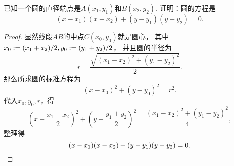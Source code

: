 \begin{example}
已知一个圆的直径端点是\(A(x_1,y_1)\)和\(B(x_2,y_2)\).
证明：圆的方程是\begin{equation}\label{equation:平面解析几何.圆的直径式方程}
	(x-x_1)(x-x_2) + (y-y_1)(y-y_2) = 0.
\end{equation}
\begin{proof}
显然线段\(AB\)的中点\(C(x_0,y_0)\)就是圆心，
其中\(
	x_0 := (x_1+x_2)/2,
	y_0 := (y_1+y_2)/2
\)，
并且圆的半径为\begin{equation*}
	r = \frac{\sqrt{(x_1-x_2)^2+(y_1-y_2)^2}}{2}.
\end{equation*}
那么所求圆的标准方程为\begin{equation*}
	(x-x_0)^2 + (y-y_0)^2 = r^2.
\end{equation*}
代入\(x_0,y_0,r\)，得\begin{equation*}
	\left( x - \frac{x_1+x_2}{2} \right)^2
	+ \left( y - \frac{y_1+y_2}{2} \right)^2
	= \frac{(x_1-x_2)^2+(y_1-y_2)^2}{4},
\end{equation*}
整理得\begin{equation*}
	(x-x_1)(x-x_2) + (y-y_1)(y-y_2) = 0.
	\qedhere
\end{equation*}
\end{proof}
\end{example}

